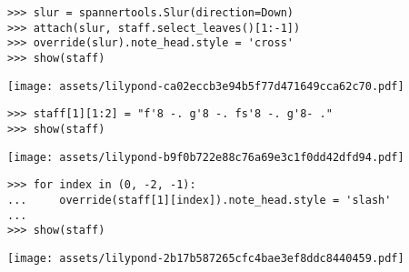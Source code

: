 \begin{comment}
<abjad>
slur = spannertools.Slur(direction=Down)
attach(slur, staff.select_leaves()[1:-1])
override(slur).note_head.style = 'cross'
show(staff)
</abjad>
\end{comment}

\begin{abjadbookoutput}
\begin{singlespacing}
\vspace{-0.5\baselineskip}
\begin{lstlisting}
>>> slur = spannertools.Slur(direction=Down)
>>> attach(slur, staff.select_leaves()[1:-1])
>>> override(slur).note_head.style = 'cross'
>>> show(staff)
\end{lstlisting}
\noindent\texttt{[image: assets/lilypond-ca02eccb3e94b5f77d471649cca62c70.pdf]}
\end{singlespacing}
\end{abjadbookoutput}

\begin{comment}
<abjad>
staff[1][1:2] = "f'8 -. g'8 -. fs'8 -. g'8- ."
show(staff)
</abjad>
\end{comment}

\begin{abjadbookoutput}
\begin{singlespacing}
\vspace{-0.5\baselineskip}
\begin{lstlisting}
>>> staff[1][1:2] = "f'8 -. g'8 -. fs'8 -. g'8- ."
>>> show(staff)
\end{lstlisting}
\noindent\texttt{[image: assets/lilypond-b9f0b722e88c76a69e3c1f0dd42dfd94.pdf]}
\end{singlespacing}
\end{abjadbookoutput}

\begin{comment}
<abjad>
for index in (0, -2, -1):
    override(staff[1][index]).note_head.style = 'slash'

show(staff)
</abjad>
\end{comment}

\begin{abjadbookoutput}
\begin{singlespacing}
\vspace{-0.5\baselineskip}
\begin{lstlisting}
>>> for index in (0, -2, -1):
...     override(staff[1][index]).note_head.style = 'slash'
...
>>> show(staff)
\end{lstlisting}
\noindent\texttt{[image: assets/lilypond-2b17b587265cfc4bae3ef8ddc8440459.pdf]}
\end{singlespacing}
\end{abjadbookoutput}

